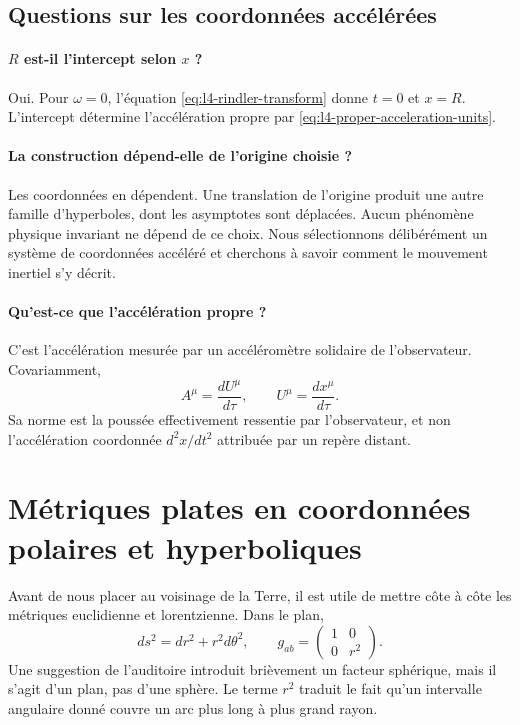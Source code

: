 \subsection{Questions sur les coordonnées accélérées}

\paragraph{\(R\) est-il l’intercept selon \(x\) ?}
Oui. Pour \(\omega=0\), l’équation \eqref{eq:l4-rindler-transform} donne \(t=0\) et \(x=R\). L’intercept détermine l’accélération propre par \eqref{eq:l4-proper-acceleration-units}.

\paragraph{La construction dépend-elle de l’origine choisie ?}
Les coordonnées en dépendent. Une translation de l’origine produit une autre famille d’hyperboles, dont les asymptotes sont déplacées. Aucun phénomène physique invariant ne dépend de ce choix. Nous sélectionnons délibérément un système de coordonnées accéléré et cherchons à savoir comment le mouvement inertiel s’y décrit.

\paragraph{Qu’est-ce que l’accélération propre ?}
C’est l’accélération mesurée par un accéléromètre solidaire de l’observateur. Covariamment,
\begin{equation}
A^\mu=\frac{dU^\mu}{d\tau},
\qquad
U^\mu=\frac{dx^\mu}{d\tau}.
\end{equation}
Sa norme est la poussée effectivement ressentie par l’observateur, et non l’accélération coordonnée \(d^2x/dt^2\) attribuée par un repère distant.

\section{Métriques plates en coordonnées polaires et hyperboliques}

Avant de nous placer au voisinage de la Terre, il est utile de mettre côte à côte les métriques euclidienne et lorentzienne. Dans le plan,
\begin{equation}
ds^2=dr^2+r^2d\theta^2,
\qquad
g_{ab}
=
\begin{pmatrix}
1&0\\
0&r^2
\end{pmatrix}.
\label{eq:l4-polar-metric}
\end{equation}
Une suggestion de l’auditoire introduit brièvement un facteur sphérique, mais il s’agit d’un plan, pas d’une sphère. Le terme \(r^2\) traduit le fait qu’un intervalle angulaire donné couvre un arc plus long à plus grand rayon.

